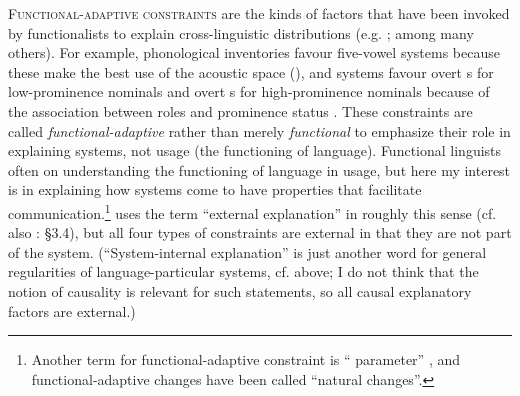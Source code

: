 \documentclass[output=paper]{langsci/langscibook}
\begin{document}
\textsc{Functional-adaptive constraints} are the kinds of factors that have been invoked by functionalists to explain cross-linguistic distributions (e.g. \citealt{Tomlin1986,Malchukov2008,Hawkins2014_VarEff}; among many others). For example, phonological inventories favour five-vowel systems because these make the best use of the acoustic space (\citealt{DeBoer2001}), and  systems favour overt s for low-prominence nominals and overt s for high-prominence nominals because of the association between roles and prominence status \citep{Dixon1994}. These constraints are called \textit{functional-adaptive} rather than merely \textit{functional} to emphasize their role in explaining systems, not usage (the functioning of language). Functional linguists often  on understanding the functioning of language in usage, but here my interest is in explaining how systems come to have properties that facilitate communication.\footnote{Another term for functional-adaptive constraint is “ parameter” \citep{DresslerEtAl1987}, and functional-adaptive changes have been called “natural changes”.} \citet{Good2008_Intro} uses the term “external explanation” in roughly this sense (cf. also \citealt{Newmeyer1998}: §3.4), but all four types of constraints are external in that they are not part of the system. (“System-internal explanation” is just another word for general regularities of language-particular systems, cf.  above; I do not think that the notion of causality is relevant for such statements, so all causal explanatory factors are external.)
\end{document}
